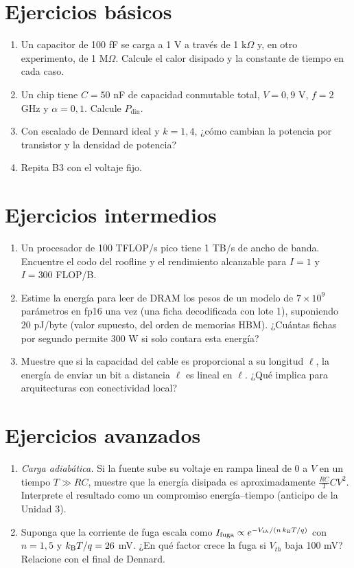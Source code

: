 \documentclass[11pt,a4paper]{article}
\begin{document}

\section{Ejercicios básicos}
\begin{enumerate}[label=\textbf{B\arabic*.}]
\item Un capacitor de 100 fF se carga a 1 V a través de 1 k$\Omega$ y, en otro experimento, de 1 M$\Omega$. Calcule el calor disipado y la constante de tiempo en cada caso.
\item Un chip tiene $C=50$ nF de capacidad conmutable total, $V=0{,}9$ V, $f=2$ GHz y $\alpha=0{,}1$. Calcule $P_{\text{din}}$.
\item Con escalado de Dennard ideal y $k=1{,}4$, ¿cómo cambian la potencia por transistor y la densidad de potencia?
\item Repita B3 con el voltaje fijo.
\end{enumerate}

\section{Ejercicios intermedios}
\begin{enumerate}[label=\textbf{I\arabic*.}]
\item Un procesador de 100 TFLOP/s pico tiene 1 TB/s de ancho de banda. Encuentre el codo del roofline y el rendimiento alcanzable para $I=1$ y $I=300$ FLOP/B.
\item Estime la energía para leer de DRAM los pesos de un modelo de $7\times10^9$ parámetros en fp16 una vez (una ficha decodificada con lote 1), suponiendo 20 pJ/byte (valor supuesto, del orden de memorias HBM). ¿Cuántas fichas por segundo permite 300 W si solo contara esta energía?
\item Muestre que si la capacidad del cable es proporcional a su longitud $\ell$, la energía de enviar un bit a distancia $\ell$ es lineal en $\ell$. ¿Qué implica para arquitecturas con conectividad local?
\end{enumerate}

\section{Ejercicios avanzados}
\begin{enumerate}[label=\textbf{A\arabic*.}]
\item \emph{Carga adiabática.} Si la fuente sube su voltaje en rampa lineal de 0 a $V$ en un tiempo $T\gg RC$, muestre que la energía disipada es aproximadamente $\frac{RC}{T}CV^2$. Interprete el resultado como un compromiso energía--tiempo (anticipo de la Unidad 3).
\item Suponga que la corriente de fuga escala como $I_{\text{fuga}}\propto e^{-V_{th}/(n\,k_{\mathrm B} T/q)}$ con $n=1{,}5$ y $k_{\mathrm B} T/q=26$ mV. ¿En qué factor crece la fuga si $V_{th}$ baja 100 mV? Relacione con el final de Dennard.
\end{enumerate}
\end{document}
